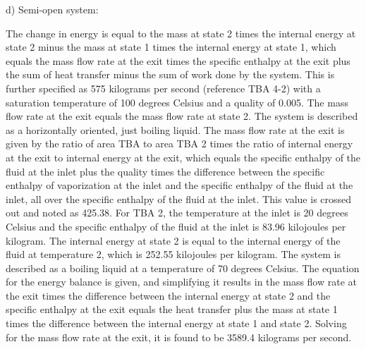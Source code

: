 d) Semi-open system:

The change in energy is equal to the mass at state 2 times the internal energy at state 2 minus the mass at state 1 times the internal energy at state 1, which equals the mass flow rate at the exit times the specific enthalpy at the exit plus the sum of heat transfer minus the sum of work done by the system. This is further specified as 575 kilograms per second (reference TBA 4-2) with a saturation temperature of 100 degrees Celsius and a quality of 0.005. The mass flow rate at the exit equals the mass flow rate at state 2. The system is described as a horizontally oriented, just boiling liquid. The mass flow rate at the exit is given by the ratio of area TBA to area TBA 2 times the ratio of internal energy at the exit to internal energy at the exit, which equals the specific enthalpy of the fluid at the inlet plus the quality times the difference between the specific enthalpy of vaporization at the inlet and the specific enthalpy of the fluid at the inlet, all over the specific enthalpy of the fluid at the inlet. This value is crossed out and noted as 425.38. For TBA 2, the temperature at the inlet is 20 degrees Celsius and the specific enthalpy of the fluid at the inlet is 83.96 kilojoules per kilogram. The internal energy at state 2 is equal to the internal energy of the fluid at temperature 2, which is 252.55 kilojoules per kilogram. The system is described as a boiling liquid at a temperature of 70 degrees Celsius. The equation for the energy balance is given, and simplifying it results in the mass flow rate at the exit times the difference between the internal energy at state 2 and the specific enthalpy at the exit equals the heat transfer plus the mass at state 1 times the difference between the internal energy at state 1 and state 2. Solving for the mass flow rate at the exit, it is found to be 3589.4 kilograms per second.